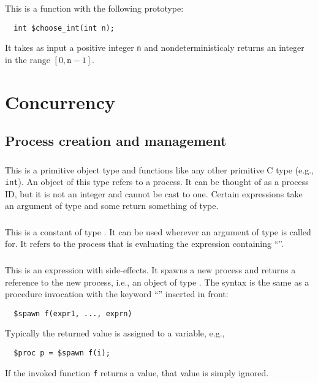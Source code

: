 \subsection{\cchooseint} This is a function with the following
prototype:
\begin{verbatim}
  int $choose_int(int n);
\end{verbatim}
It takes as input a positive integer \texttt{n} and
nondeterministicaly returns an integer in the range
$[0,\texttt{n}-1]$.


\chapter{Concurrency}

\section{Process creation and management}

\subsection{\cproc} This is a primitive object type and functions like
any other primitive C type (e.g., \texttt{int}).  An object of this
type refers to a process.  It can be thought of as a process ID, but
it is not an integer and cannot be cast to one.  Certain expressions
take an argument of \cproc{} type and some return something of
\cproc{} type.

\subsection{\cself} This is a constant of type \cproc.  It can be used
wherever an argument of type \cproc{} is called for.  It refers to the
process that is evaluating the expression containing ``\cself''.

\subsection{\cspawn} This is an expression with side-effects.  It
spawns a new process and returns a reference to the new process, i.e.,
an object of type \cproc.  The syntax is the same as a procedure
invocation with the keyword ``\cspawn'' inserted in front:
\begin{verbatim}
  $spawn f(expr1, ..., exprn)
\end{verbatim}
Typically the returned value is assigned to a variable, e.g.,
\begin{verbatim}
  $proc p = $spawn f(i);
\end{verbatim}
If the invoked function \texttt{f} returns a value, that value is
simply ignored.

